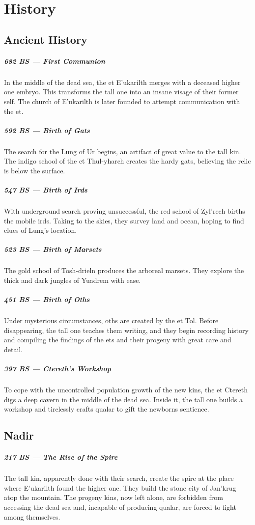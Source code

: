\section{History} \label{sec::history}

\subsection*{Ancient History}
\subparagraph{682 BS --- First Communion} In the middle of the dead sea, the et E'ukarilth merges with a deceased higher one embryo.
This transforms the tall one into an insane visage of their former self.
The church of E'ukarilth is later founded to attempt communication with the et.

\subparagraph{592 BS --- Birth of Gats} The search for the Lung of Ur begins, an artifact of great value to the tall kin.
The indigo school of the et Thul-yharch creates the hardy gats, believing the relic is below the surface.

\subparagraph{547 BS --- Birth of Irds} With underground search proving unsuccessful, the red school of Zyl'rech births the mobile irds.
Taking to the skies, they survey land and ocean, hoping to find clues of Lung's location.

\subparagraph{523 BS --- Birth of Marsets} The gold school of Tosh-drieln produces the arboreal marsets.
They explore the thick and dark jungles of Yuadrem with ease.

\subparagraph{451 BS --- Birth of Oths} Under mysterious circumstances, oths are created by the et Tol.
Before disappearing, the tall one teaches them writing, and they begin recording history and compiling the findings of the ets and their progeny with great care and detail.

\subparagraph{397 BS --- Ctereth's Workshop} To cope with the uncontrolled population growth of the new kins, the et Ctereth digs a deep cavern in the middle of the dead sea.
Inside it, the tall one builds a workshop and tirelessly crafts qualar to gift the newborns sentience.

\subsection*{Nadir}
\subparagraph{217 BS --- The Rise of the Spire} The tall kin, apparently done with their search, create the spire at the place where E'ukarilth found the higher one.
They build the stone city of Jan'krug atop the mountain.
The progeny kins, now left alone, are forbidden from accessing the dead sea and, incapable of producing qualar, are forced to fight among themselves.


